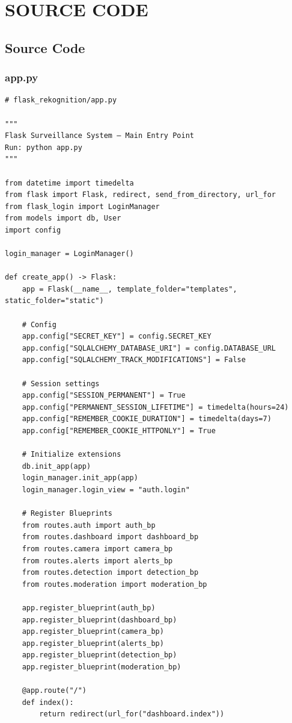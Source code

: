 \documentclass[10pt,openany]{report}
\begin{document}
\begin{sloppypar}
{{{\begin{sloppypar}
\chapter{SOURCE CODE}
\section{Source Code}
\subsection{app.py}

\begin{lstlisting}
# flask_rekognition/app.py

"""
Flask Surveillance System — Main Entry Point
Run: python app.py
"""

from datetime import timedelta
from flask import Flask, redirect, send_from_directory, url_for
from flask_login import LoginManager
from models import db, User
import config

login_manager = LoginManager()

def create_app() -> Flask:
    app = Flask(__name__, template_folder="templates", static_folder="static")

    # Config
    app.config["SECRET_KEY"] = config.SECRET_KEY
    app.config["SQLALCHEMY_DATABASE_URI"] = config.DATABASE_URL
    app.config["SQLALCHEMY_TRACK_MODIFICATIONS"] = False

    # Session settings
    app.config["SESSION_PERMANENT"] = True
    app.config["PERMANENT_SESSION_LIFETIME"] = timedelta(hours=24)
    app.config["REMEMBER_COOKIE_DURATION"] = timedelta(days=7)
    app.config["REMEMBER_COOKIE_HTTPONLY"] = True

    # Initialize extensions
    db.init_app(app)
    login_manager.init_app(app)
    login_manager.login_view = "auth.login"

    # Register Blueprints
    from routes.auth import auth_bp
    from routes.dashboard import dashboard_bp
    from routes.camera import camera_bp
    from routes.alerts import alerts_bp
    from routes.detection import detection_bp
    from routes.moderation import moderation_bp

    app.register_blueprint(auth_bp)
    app.register_blueprint(dashboard_bp)
    app.register_blueprint(camera_bp)
    app.register_blueprint(alerts_bp)
    app.register_blueprint(detection_bp)
    app.register_blueprint(moderation_bp)

    @app.route("/")
    def index():
        return redirect(url_for("dashboard.index"))


\end{lstlisting}
\end{sloppypar}}}}
\end{sloppypar}
\end{document}
